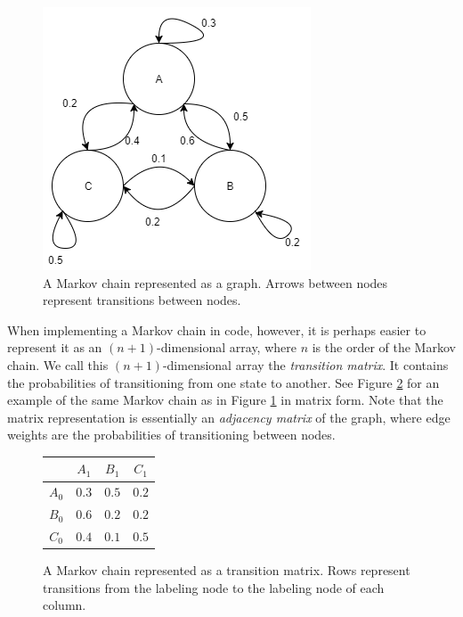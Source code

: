 \begin{figure}[h]
	\centering
	\includegraphics[width=\linewidth]{figures/markovGraph.png} %
	\caption[A Markov chain represented as a graph.]{A Markov chain represented as a graph. Arrows between nodes represent transitions between nodes.}
	\label{fig:markovGraph}
\end{figure}

When implementing a Markov chain in code, however, it is perhaps easier to represent it as an $(n + 1)$-dimensional array, where $n$ is the order of the Markov chain.
We call this $(n + 1)$-dimensional array the \textit{transition matrix}.
It contains the probabilities of transitioning from one state to another.
See Figure \ref{fig:markovMatrix} for an example of the same Markov chain as in Figure \ref{fig:markovGraph} in matrix form.
Note that the matrix representation is essentially an \textit{adjacency matrix} of the graph, where edge weights are the probabilities of transitioning between nodes.

\begin{figure}[h]
	\centering
	\begin{tabular}{c | c c c}
		& $A_{1}$ & $B_{1}$ & $C_{1}$\\
		\hline
		$A_{0}$ & $0.3$ & $0.5$ & $0.2$\\
		$B_{0}$ & $0.6$ & $0.2$ & $0.2$\\
		$C_{0}$ & $0.4$ & $0.1$ & $0.5$
	\end{tabular}
	\caption[A Markov chain represented as a transition matrix.]{A Markov chain represented as a transition matrix. Rows represent transitions from the labeling node to the labeling node of each column.}
	\label{fig:markovMatrix}
\end{figure}

